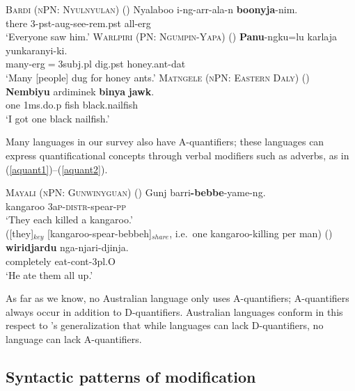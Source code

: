 \documentclass[12pt,egregdoesnotlikesansseriftitles]{scrartcl}
\begin{document}
\begin{exe}
  \ex\label{allerg} \textsc{Bardi (nPN: Nyulnyulan)} (\citealt[272]{bowern12})
  \gll Nyalaboo i-ng-arr-ala-n \textbf{boonyja}-nim.\\
  there 3-{\sc pst}-{\sc aug}-see-{\sc rem.pst} all-{\sc erg}\\
  \glt `Everyone saw him.'
  \ex \textsc{Warlpiri (PN: Ngumpin-Yapa)} (\citealt[6]{bowler17})
  \gll \textbf{Panu}-ngku=lu karlaja yunkaranyi-ki.\\
  many-{\sc erg}$=${\sc 3subj.pl} dig.{\sc pst} honey.ant-{\sc dat}\\
  \glt `Many [people] dug for honey ants.' \label{agrmarking1}
  \ex \textsc{Matngele (nPN: Eastern Daly)} (\citealt[54]{zandvoort99})
  \gll \textbf{Nembiyu} ardiminek \textbf{binya} \textbf{jawk}.\\
  one 1{\sc ms.}do.{\sc p} fish black.nailfish\\
  \glt `I got one black nailfish.'  \label{discconst}
\end{exe}


Many languages in our survey also have A-quantifiers; these languages can express quantificational concepts through verbal modifiers such as adverbs, as in (\ref{aquant1})--(\ref{aquant2}).


\begin{exe}
  \ex \textsc{Mayali (nPN: Gunwinyguan)} (\citealt[221]{evans95})
  \gll Gunj barri\textbf{-bebbe}-yame-ng.\\
  kangaroo 3a\textsc{p-distr}-spear-\textsc{pp}\\
  \glt `They each killed a kangaroo.'\\
  ([they]$_{key}$ [kangaroo-spear-bebbeh]$_{share}$, i.e.\ one kangaroo-killing per man) \label{aquant1}
   (\citealt[54]{sands89})
  \gll \textbf{wiridjardu}  nga-njari-djinja.\\
  completely  eat-{\sc cont}-3{\sc pl.O}     \\   
  \glt `He ate them all up.' \label{aquant2}
\end{exe}

As far as we know, no Australian language only uses A-quantifiers; A-quantifiers always  occur in addition to D-quantifiers. Australian languages conform in this respect to \cite{bachetal95}'s generalization that while languages can lack D-quantifiers, no language can lack A-quantifiers.

\subsection{Syntactic patterns of modification}
\end{document}
